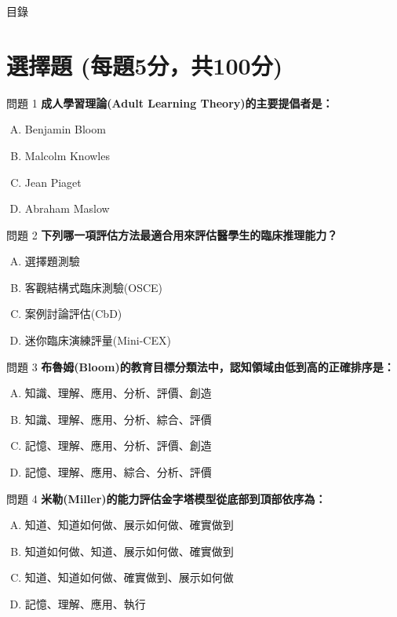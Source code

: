 \documentclass[aspectratio=169]{beamer}
\begin{document}
\begin{frame}{目錄}
  \tableofcontents
\end{frame}

\section{選擇題 (每題5分，共100分)}

\begin{frame}{問題 1}
  \textbf{成人學習理論(Adult Learning Theory)的主要提倡者是：}
  \begin{enumerate}[A.]
    \item Benjamin Bloom
    \item Malcolm Knowles
    \item Jean Piaget
    \item Abraham Maslow
  \end{enumerate}
\end{frame}

\begin{frame}{問題 2}
  \textbf{下列哪一項評估方法最適合用來評估醫學生的臨床推理能力？}
  \begin{enumerate}[A.]
    \item 選擇題測驗
    \item 客觀結構式臨床測驗(OSCE)
    \item 案例討論評估(CbD)
    \item 迷你臨床演練評量(Mini-CEX)
  \end{enumerate}
\end{frame}

\begin{frame}{問題 3}
  \textbf{布魯姆(Bloom)的教育目標分類法中，認知領域由低到高的正確排序是：}
  \begin{enumerate}[A.]
    \item 知識、理解、應用、分析、評價、創造
    \item 知識、理解、應用、分析、綜合、評價
    \item 記憶、理解、應用、分析、評價、創造
    \item 記憶、理解、應用、綜合、分析、評價
  \end{enumerate}
\end{frame}

\begin{frame}{問題 4}
  \textbf{米勒(Miller)的能力評估金字塔模型從底部到頂部依序為：}
  \begin{enumerate}[A.]
    \item 知道、知道如何做、展示如何做、確實做到
    \item 知道如何做、知道、展示如何做、確實做到
    \item 知道、知道如何做、確實做到、展示如何做
    \item 記憶、理解、應用、執行
  \end{enumerate}
\end{frame}
\end{document}
